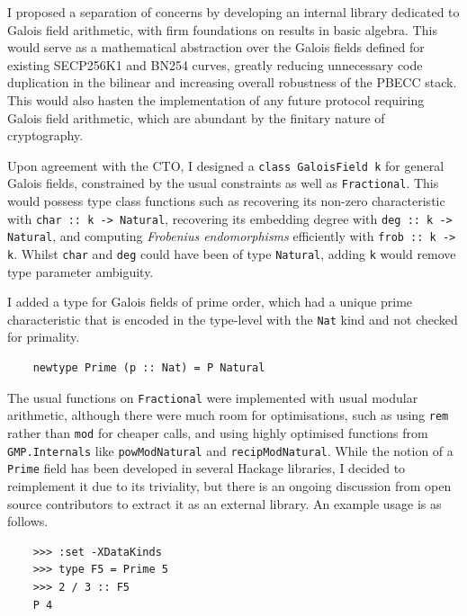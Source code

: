 \documentclass[11pt]{article}
\begin{document}
I proposed a separation of concerns by developing an internal library dedicated to Galois field arithmetic, with firm foundations on results in basic algebra. This would serve as a mathematical abstraction over the Galois fields defined for existing SECP256K1 and BN254 curves, greatly reducing unnecessary code duplication in the bilinear and increasing overall robustness of the PBECC stack. This would also hasten the implementation of any future protocol requiring Galois field arithmetic, which are abundant by the finitary nature of cryptography.

Upon agreement with the CTO, I designed a \texttt{class GaloisField k} for general Galois fields, constrained by the usual constraints as well as \texttt{Fractional}. This would possess type class functions such as recovering its non-zero characteristic with \texttt{char :: k -> Natural}, recovering its embedding degree with \texttt{deg :: k -> Natural}, and computing \emph{Frobenius endomorphisms} efficiently with \texttt{frob :: k -> k}. Whilst \texttt{char} and \texttt{deg} could have been of type \texttt{Natural}, adding \texttt{k} would remove type parameter ambiguity.

I added a type for Galois fields of prime order, which had a unique prime characteristic that is encoded in the type-level with the \texttt{Nat} kind and not checked for primality.
\begin{verbatim}
    newtype Prime (p :: Nat) = P Natural
\end{verbatim}
The usual functions on \texttt{Fractional} were implemented with usual modular arithmetic, although there were much room for optimisations, such as using \texttt{rem} rather than \texttt{mod} for cheaper calls, and using highly optimised functions from \texttt{GMP.Internals} like \texttt{powModNatural} and \texttt{recipModNatural}. While the notion of a \texttt{Prime} field has been developed in several Hackage libraries, I decided to reimplement it due to its triviality, but there is an ongoing discussion from open source contributors to extract it as an external library. An example usage is as follows.
\begin{verbatim}
    >>> :set -XDataKinds
    >>> type F5 = Prime 5
    >>> 2 / 3 :: F5
    P 4
\end{verbatim}
\end{document}
